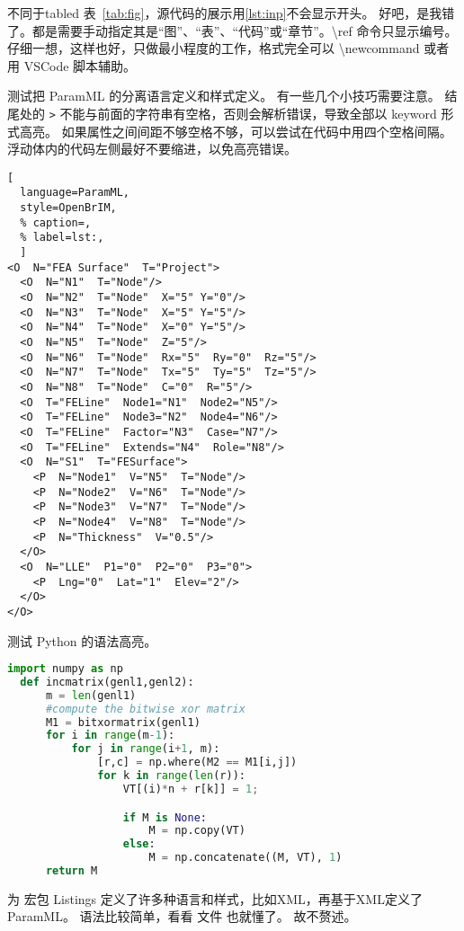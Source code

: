 \documentclass[../Main/thesis]{subfiles}
\begin{document}
不同于tabled 表~\ref{tab:fig}，源代码的展示用\ref{lst:inp}不会显示开头。
好吧，是我错了。都是需要手动指定其是“图”、“表”、“代码”或“章节”。\textbackslash ref 命令只显示编号。
仔细一想，这样也好，只做最小程度的工作，格式完全可以 \textbackslash newcommand 或者用 VSCode 脚本辅助。

测试把 ParamML 的分离语言定义和样式定义。
有一些几个小技巧需要注意。
结尾处的 \texttt{>} 不能与前面的字符串有空格，否则会解析错误，导致全部以 keyword 形式高亮。
如果属性之间间距不够空格不够，可以尝试在代码中用四个空格间隔。
浮动体内的代码左侧最好不要缩进，以免高亮错误。

\begin{lstlisting}[
  language=ParamML,
  style=OpenBrIM,
  % caption=,
  % label=lst:,
  ]
<O  N="FEA Surface"  T="Project">
  <O  N="N1"  T="Node"/>
  <O  N="N2"  T="Node"  X="5" Y="0"/>
  <O  N="N3"  T="Node"  X="5" Y="5"/>
  <O  N="N4"  T="Node"  X="0" Y="5"/>
  <O  N="N5"  T="Node"  Z="5"/>
  <O  N="N6"  T="Node"  Rx="5"  Ry="0"  Rz="5"/>
  <O  N="N7"  T="Node"  Tx="5"  Ty="5"  Tz="5"/>
  <O  N="N8"  T="Node"  C="0"  R="5"/>
  <O  T="FELine"  Node1="N1"  Node2="N5"/>
  <O  T="FELine"  Node3="N2"  Node4="N6"/>
  <O  T="FELine"  Factor="N3"  Case="N7"/>
  <O  T="FELine"  Extends="N4"  Role="N8"/>
  <O  N="S1"  T="FESurface">
    <P  N="Node1"  V="N5"  T="Node"/>
    <P  N="Node2"  V="N6"  T="Node"/>
    <P  N="Node3"  V="N7"  T="Node"/>
    <P  N="Node4"  V="N8"  T="Node"/>
    <P  N="Thickness"  V="0.5"/>
  </O>
  <O  N="LLE"  P1="0"  P2="0"  P3="0">
    <P  Lng="0"  Lat="1"  Elev="2"/>
  </O>
</O>
\end{lstlisting}

测试 Python 的语法高亮。

\begin{lstlisting}[language=Python,
  caption=Second CODE Block,
  label=lst:2nd,
  style=colored]
  import numpy as np
  def incmatrix(genl1,genl2):
      m = len(genl1)
      #compute the bitwise xor matrix
      M1 = bitxormatrix(genl1)
      for i in range(m-1):
          for j in range(i+1, m):
              [r,c] = np.where(M2 == M1[i,j])
              for k in range(len(r)):
                  VT[(i)*n + r[k]] = 1;

                  if M is None:
                      M = np.copy(VT)
                  else:
                      M = np.concatenate((M, VT), 1)
      return M
\end{lstlisting}

为 宏包 Listings 定义了许多种语言和样式，比如XML，再基于XML定义了 ParamML。
语法比较简单，看看  文件 也就懂了。
故不赘述。
\end{document}
